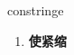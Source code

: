
\begin{frame}
{\huge constringe}
\begin{center}
\begin{enumerate}\Large
  \item \textbf{使紧缩}
\end{enumerate}
\end{center}
\end{frame}

